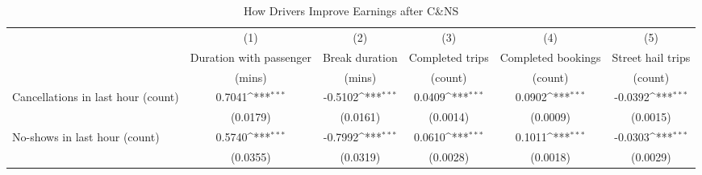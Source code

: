 \documentclass[reviewmode]{restat}
\begin{document}
\clearpage

\begin{table}[]
	\centering
	\caption{How Drivers Improve Earnings after C\&NS}
	\label{tb:earningsbreakdown}
		\setlength{\tabcolsep}{1pt}
		{
		\footnotesize
        \def\sym#1{\ifmmode^{#1}\else\(^{#1}\)\fi}
		\begin{tabularx}{\textwidth}{l@{\extracolsep{\fill}}*{5}{c}}
		\toprule
		\toprule
		                    &\multicolumn{1}{c}{(1)}&\multicolumn{1}{c}{(2)}&\multicolumn{1}{c}{(3)}&\multicolumn{1}{c}{(4)}&\multicolumn{1}{c}{(5)}\\
		                    &\multicolumn{1}{p{2cm}}{\centering Duration with passenger}&\multicolumn{1}{p{2cm}}{\centering Break duration}&\multicolumn{1}{p{2cm}}{\centering Completed trips}&\multicolumn{1}{p{2cm}}{\centering Completed bookings}&\multicolumn{1}{p{2cm}}{\centering Street hail trips}\\
		                    &\multicolumn{1}{p{2cm}}{\centering(mins)}&\multicolumn{1}{p{2cm}}{\centering (mins)}&\multicolumn{1}{p{2cm}}{\centering (count)}&\multicolumn{1}{p{2cm}}{\centering (count)}&\multicolumn{1}{p{2cm}}{\centering(count)}\\
		\midrule
		Cancellations in last hour (count)&      0.7041\sym{***}&     -0.5102\sym{***}&      0.0409\sym{***}&      0.0902\sym{***}&     -0.0392\sym{***}\\
		                    &    (0.0179)         &    (0.0161)         &    (0.0014)         &    (0.0009)         &    (0.0015)         \\
		\addlinespace
		No-shows in last hour (count)&      0.5740\sym{***}&     -0.7992\sym{***}&      0.0610\sym{***}&      0.1011\sym{***}&     -0.0303\sym{***}\\
		                    &    (0.0355)         &    (0.0319)         &    (0.0028)         &    (0.0018)         &    (0.0029)         \\

\end{tabularx}}
\end{table}
\end{document}
